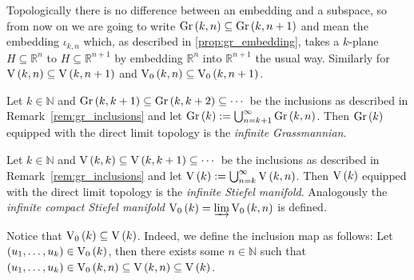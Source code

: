 \begin{remark}\label{rem:gr_inclusions} Topologically there is no difference between an embedding and a subspace, so from now on we are going to write $\Gr{k}{n}\subseteq\Gr{k}{n+1}$ and mean the embedding $\iota_{k,n}$ which, as described in \ref{prop:gr_embedding}, takes a $k$-plane $H\subseteq\mathbb{R}^n$ to $H\subseteq\mathbb{R}^{n+1}$ by embedding $\mathbb{R}^n$ into $\mathbb{R}^{n+1}$ the usual way. Similarly for $\St{k}{n}\subseteq\St{k}{n+1}$ and $\StO{k}{n}\subseteq\StO{k}{n+1}$.
\end{remark}

\begin{definition} Let $k\in\mathbb{N}$ and $\Gr{k}{k+1}\subseteq\Gr{k}{k+2}\subseteq\cdots$ be the inclusions as described in Remark~\ref{rem:gr_inclusions} and let $\Gr{k}:=\bigcup_{n=k+1}^{\infty}\Gr{k}{n}$. Then $\Gr{k}$ equipped with the direct limit topology is the \emph{infinite Grassmannian}.
\end{definition}

\begin{definition} Let $k\in\mathbb{N}$ and $\St{k}{k}\subseteq\St{k}{k+1}\subseteq\cdots$ be the inclusions as described in Remark~\ref{rem:gr_inclusions} and let $\St{k}:=\bigcup_{n=k}^{\infty}\St{k}{n}$. Then $\St{k}$ equipped with the direct limit topology is the \emph{infinite Stiefel manifold}. Analogously the \emph{infinite compact Stiefel manifold} $\StO{k}=\varinjlim\StO{k}{n}$ is defined.
\end{definition}
\begin{remark}\label{rem:st_inclusion} Notice that $\StO{k}\subseteq\St{k}$. Indeed, we define the inclusion map as follows: Let $(u_1,\ldots,u_k)\in\StO{k}$, then there exists some $n\in\mathbb{N}$ such that $(u_1,\ldots,u_k)\in\StO{k}{n}\subseteq\St{k}{n}\subseteq\St{k}$.
\end{remark}

